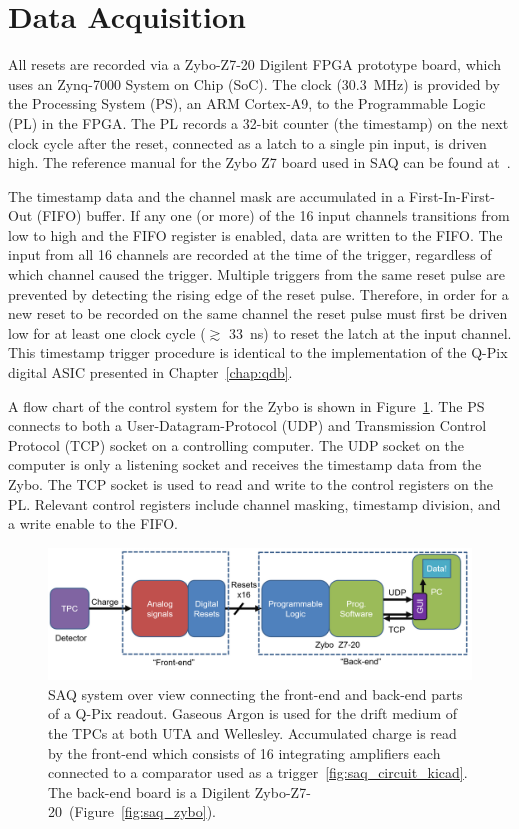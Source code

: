 \section{Data Acquisition}
All resets are recorded via a Zybo-Z7-20 Digilent FPGA prototype board, which uses an Zynq-7000 System on Chip (SoC).
The clock (30.3~\unit{MHz}) is provided by the Processing System (PS), an ARM Cortex-A9, to the Programmable Logic (PL) in the FPGA.
The PL records a 32-bit counter (the timestamp) on the next clock cycle after the reset, connected as a latch to a single pin input, is driven high.
The reference manual for the Zybo Z7 board used in SAQ can be found at~\citep{zybo_zy_reference}.

The timestamp data and the channel mask are accumulated in a First-In-First-Out (FIFO) buffer.
If any one (or more) of the 16 input channels transitions from low to high and the FIFO register is enabled, data are written to the FIFO.
The input from all 16 channels are recorded at the time of the trigger, regardless of which channel caused the trigger.
Multiple triggers from the same reset pulse are prevented by detecting the rising edge of the reset pulse.
Therefore, in order for a new reset to be recorded on the same channel the reset pulse must first be driven low for at least one clock cycle ($\gtrsim$ 33~\unit{ns}) to reset the latch at the input channel.
This timestamp trigger procedure is identical to the implementation of the Q-Pix digital ASIC presented in Chapter~\ref{chap:qdb}.

A flow chart of the control system for the Zybo is shown in Figure~\ref{fig:saq_diagram}.
The PS connects to both a User-Datagram-Protocol (UDP) and Transmission Control Protocol (TCP) socket on a controlling computer.
The UDP socket on the computer is only a listening socket and receives the timestamp data from the Zybo.
The TCP socket is used to read and write to the control registers on the PL.
Relevant control registers include channel masking, timestamp division, and a write enable to the FIFO.

\begin{figure}[]
\centering
\includegraphics[width=\textwidth]{images/saq_daq_back-end_summary.png}
\caption{SAQ system over view connecting the front-end and back-end parts of a Q-Pix readout.
Gaseous Argon is used for the drift medium of the TPCs at both UTA and Wellesley.
Accumulated charge is read by the front-end which consists of 16 integrating amplifiers each connected to a comparator used as a trigger~\ref{fig:saq_circuit_kicad}.
The back-end board is a Digilent Zybo-Z7-20~(Figure~\ref{fig:saq_zybo}).
}
\label{fig:saq_diagram}
\end{figure}

